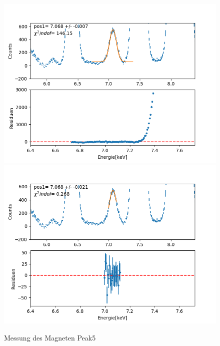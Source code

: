 \documentclass[12pt,a4paper]{article}
\begin{document}
\begin{figure}[H]
\centering
\includegraphics[scale=0.49]{Bilder/roentgen_spektren/magnet/mag5_1.png}
\includegraphics[scale=0.49]{Bilder/roentgen_spektren/magnet/mag5_2.png}
\caption{Messung des Magneten Peak5}
\end{figure}
\end{document}
